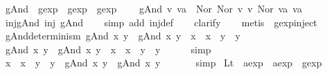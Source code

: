 \begin{isabellebody}
\isanewline
{}\isamarkupfalse%
\ gAnd\ {\isacharcolon}{\isacharcolon}\ {\isachardoublequoteopen}gexp\ {\isasymRightarrow}\ gexp\ {\isasymRightarrow}\ gexp{\isachardoublequoteclose}\ \ \isanewline
\ \ {\isachardoublequoteopen}gAnd\ v\ va\ {\isasymequiv}\ Nor\ {\isacharparenleft}Nor\ v\ v{\isacharparenright}\ {\isacharparenleft}Nor\ va\ va{\isacharparenright}{\isachardoublequoteclose}\isanewline
\isanewline
{}\isamarkupfalse%
\ inj{\isacharunderscore}gAnd{\isacharcolon}\ {\isachardoublequoteopen}inj\ gAnd{\isachardoublequoteclose}\isanewline
%
\isadelimproof
\ \ %
\endisadelimproof
%
\isatagproof
{}\isamarkupfalse%
\ {\isacharparenleft}simp\ add{\isacharcolon}\ inj{\isacharunderscore}def{\isacharparenright}\isanewline
\ \ \isamarkupfalse%
\ clarify\isanewline
\ \ \isamarkupfalse%
\ {\isacharparenleft}metis\ \ gexp{\isachardot}inject{\isacharparenleft}{}{\isacharparenright}{\isacharparenright}%
\endisatagproof
{\isafoldproof}%
%
\isadelimproof
\isanewline
%
\endisadelimproof
\isanewline
{}\isamarkupfalse%
\ gAnd{\isacharunderscore}determinism{\isacharcolon}\ {\isachardoublequoteopen}{\isacharparenleft}gAnd\ x\ y\ {\isacharequal}\ gAnd\ x{\isacharprime}\ y{\isacharprime}{\isacharparenright}\ {\isacharequal}\ {\isacharparenleft}x\ {\isacharequal}\ x{\isacharprime}\ {\isasymand}\ y\ {\isacharequal}\ y{\isacharprime}{\isacharparenright}{\isachardoublequoteclose}\isanewline
%
\isadelimproof
%
\endisadelimproof
%
\isatagproof
{}\isamarkupfalse%
\isanewline
\ \ \isamarkupfalse%
\ {\isachardoublequoteopen}gAnd\ x\ y\ {\isacharequal}\ gAnd\ x{\isacharprime}\ y{\isacharprime}\ {\isasymLongrightarrow}\ x\ {\isacharequal}\ x{\isacharprime}\ {\isasymand}\ y\ {\isacharequal}\ y{\isacharprime}{\isachardoublequoteclose}\isanewline
\ \ \ \ \isamarkupfalse%
\ {\isacharparenleft}simp{\isacharparenright}\isanewline
{}\isamarkupfalse%
\isanewline
\ \ \isamarkupfalse%
\ {\isachardoublequoteopen}x\ {\isacharequal}\ x{\isacharprime}\ {\isasymand}\ y\ {\isacharequal}\ y{\isacharprime}\ {\isasymLongrightarrow}\ gAnd\ x\ y\ {\isacharequal}\ gAnd\ x{\isacharprime}\ y{\isacharprime}\ {\isachardoublequoteclose}\isanewline
\ \ \ \ \isamarkupfalse%
\ simp\isanewline
{}\isamarkupfalse%
%
\endisatagproof
{\isafoldproof}%
%
\isadelimproof
\isanewline
%
\endisadelimproof
\isanewline
{}\isamarkupfalse%
\ Lt\ {\isacharcolon}{\isacharcolon}\ {\isachardoublequoteopen}aexp\ {\isasymRightarrow}\ aexp\ {\isasymRightarrow}\ gexp{\isachardoublequoteclose}\ \ \isanewline

\end{isabellebody}
